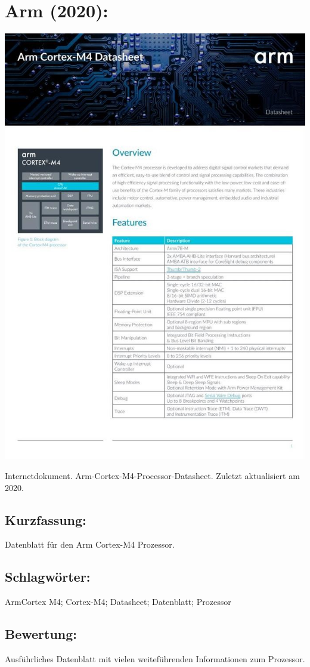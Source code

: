 \section*{Arm (2020):}
\begin{minipage}{0.5\textwidth}
	\includegraphics[width=\linewidth]{../Appendix/Literaturverzeichnis/img/Arm.jpg}
\end{minipage}
\hfill
\begin{minipage}{0.48\textwidth}
Internetdokument. Arm-Cortex-M4-Processor-Datasheet. Zuletzt aktualisiert am 2020.
\subsection*{Kurzfassung:}
Datenblatt für den Arm Cortex-M4 Prozessor.	
\subsection*{Schlagwörter:}
ArmCortex M4; Cortex-M4; Datasheet; Datenblatt; Prozessor
\subsection*{Bewertung:}
Ausführliches Datenblatt mit vielen weiteführenden Informationen zum Prozessor.
\end{minipage}

